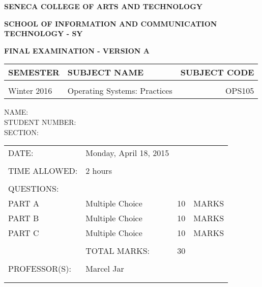 \documentclass{seneca_final}
\begin{document}
\thispagestyle{empty}
\begin{center}
\noindent
\MakeUppercase{\textbf{Seneca College of Arts and Technology}}
\vspace{0.5cm}

\noindent
\MakeUppercase{\textbf{School of Information and Communication Technology - SY}}
\vspace{0.5cm}

\noindent
\MakeUppercase{\textbf{Final Examination - Version A}}
\vspace{0.5cm}
\end{center}

\begin{tabular}{ p{3.5cm} p{7.0cm} R }
 \MakeUppercase{SEMESTER} & \MakeUppercase{SUBJECT NAME}  & \MakeUppercase{SUBJECT CODE} \\ \hline
  & & \\
  Winter 2016 & Operating Systems: Practices & OPS105 \\ \hline
\end{tabular}
\vspace{0.5cm}

\begin{center}
\MakeUppercase{name:}\underline{\hspace{8.5cm}} \\
\vspace{0.25cm}
\MakeUppercase{student number:}\underline{\hspace{6cm}}\\
\vspace{0.25cm}
\MakeUppercase{section:}\underline{\hspace{8.2cm}}
\vspace{0.5cm}
\end{center}


\begin{tabular}{ p{3.5cm} p{7.0cm} p{0.5cm} p{1.5cm}}
\MakeUppercase{date:} & Monday, April 18, 2015  & & \\
  & & & \\
\MakeUppercase{time allowed:} & 2 hours& & \\
  & & & \\
\MakeUppercase{questions:} & & & \\
\MakeUppercase{part a} & Multiple Choice & 10 & \MakeUppercase{marks}\\
\MakeUppercase{part b} & Multiple Choice & 10 & \MakeUppercase{marks}\\
\MakeUppercase{part c} & Multiple Choice & 10 & \MakeUppercase{marks}\\
\MakeUppercase{} & & & \\
& \MakeUppercase{total marks:} & 30 &\\
& & & \\
\MakeUppercase{Professor(s):} & Marcel Jar & & \\
\MakeUppercase{} & & & \\
\MakeUppercase{} & & & \\
\end{tabular}
\end{document}
